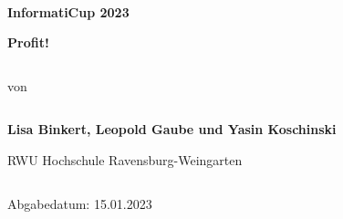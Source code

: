 
\begin{verbatim}
\end{verbatim}

\begin{verbatim}
	
\end{verbatim}
\begin{center}
	\textbf{InformatiCup 2023}
\end{center}
\begin{center}
	\large{\textbf{Profit!}}
\end{center}

\begin{verbatim}
\end{verbatim}
\begin{center}
	von
	\begin{verbatim}
	\end{verbatim}
	\large \textbf{Lisa Binkert, Leopold Gaube und Yasin Koschinski}
\end{center}
\begin{center}

	RWU Hochschule Ravensburg-Weingarten %
\end{center}

\begin{verbatim}
\end{verbatim}
\begin{center}
	Abgabedatum: 15.01.2023
\end{center}
\begin{verbatim}
	
	
	
\end{verbatim}	
